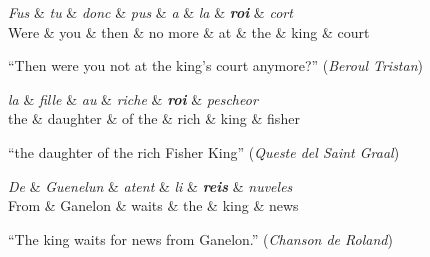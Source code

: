 \begin{center}
    \begin{dependency}[theme=simple]
        \begin{deptext}[row 2/.style={font=\small}]
            \textit{Fus} \& \textit{tu} \& \textit{donc} \& \textit{pus} \& \textit{a} \& \textit{la} \& \textbf{\textit{roi}} \& \textit{cort} \\
            Were \& you \& then \& no more \& at \& the \& king \& court \\
        \end{deptext}
    \end{dependency}

    \raggedright
    \enquote{Then were you not at the king's court anymore?} (\emph{Beroul Tristan})
\end{center}

\begin{center}
    \begin{dependency}[theme=simple]
        \begin{deptext}[row 2/.style={font=\small}]
            \textit{la} \& \textit{fille} \& \textit{au} \& \textit{riche} \& \textbf{\textit{roi}} \& \textit{pescheor} \\
            the \& daughter \& of the \& rich \& king \& fisher \\
        \end{deptext}
    \end{dependency}

    \raggedright
    \enquote{the daughter of the rich Fisher King} (\emph{Queste del Saint Graal})
\end{center}

\begin{center}
    \begin{dependency}[theme=simple]
        \begin{deptext}[row 2/.style={font=\small}]
            \textit{De} \& \textit{Guenelun} \& \textit{atent} \& \textit{li} \& \textbf{\textit{reis}} \& \textit{nuveles} \\
            From \& Ganelon \& waits \& the \& king \& news \\
        \end{deptext}
    \end{dependency}

    \raggedright
    \enquote{The king waits for news from Ganelon.} (\emph{Chanson de Roland})
\end{center}

